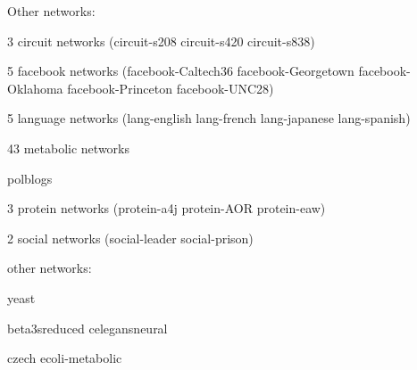 Other networks:

3 circuit networks (circuit-s208 circuit-s420 circuit-s838)

5 facebook networks (facebook-Caltech36 facebook-Georgetown facebook-Oklahoma
facebook-Princeton facebook-UNC28)

5 language networks (lang-english  lang-french lang-japanese lang-spanish)

43 metabolic networks

polblogs

3 protein networks (protein-a4j protein-AOR protein-eaw)

2 social networks (social-leader social-prison)

other networks:

yeast

beta3sreduced
celegansneural

czech
ecoli-metabolic
